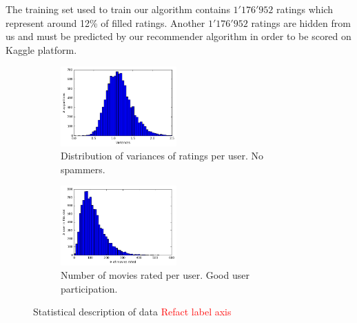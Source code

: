 \documentclass[10pt,conference,compsocconf]{IEEEtran}
\begin{document}
The training set used to train our algorithm contains $1'176'952$ ratings which represent around 12\% of filled ratings. 
Another $1'176'952$ ratings are hidden from us and must be predicted by our recommender algorithm in order to be scored on Kaggle platform.




\begin{figure}[tbp] %
    \centering
    \hspace{-0.6cm}
    \begin{subfigure}[t]{0.45\columnwidth}
        \centering
        \includegraphics[height=1.2in]{img/Variances}
        \vspace{-3mm}
  \caption{Distribution of variances of ratings per user. No spammers.}
  \label{variances}
    \end{subfigure}%
    \hspace{0.4cm}
    \begin{subfigure}[t]{0.45\columnwidth}
        \centering
        \includegraphics[height=1.2in]{img/Ratings}
        \vspace{-3mm}
        \caption{Number of movies rated per user. Good user participation.}
        \label{number_ratings}
    \end{subfigure}
    \caption{Statistical description of data \textcolor{red}{Refact label axis}}
\end{figure}
\end{document}
